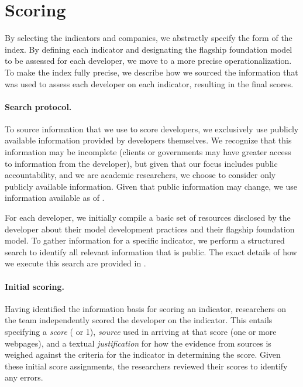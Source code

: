 \hypertarget{scoring}{\section{Scoring}}
\label{sec:scoring}
By selecting the indicators and companies, we abstractly specify the form of the index.
By defining each indicator and designating the flagship foundation model to be assessed for each developer, we move to a more precise operationalization. 
To make the index fully precise, we describe how we sourced the information that was used to assess each developer on each indicator, resulting in the final scores.

\paragraph{Search protocol.}
To source information that we use to score developers, we exclusively use publicly available information provided by developers themselves.
We recognize that this information may be incomplete (\eg clients or governments may have greater access to information from the developer), but given that our focus includes public accountability, and we are academic researchers, we choose to consider only publicly available information.
Given that public information may change, we use information available as of \informationfreezedate.

For each developer, we initially compile a basic set of resources disclosed by the developer about their model development practices and their flagship foundation model.
To gather information for a specific indicator, we perform a structured search to identify all relevant information that is public.
The exact details of how we execute this search are provided in .

\paragraph{Initial scoring.}
Having identified the information basis for scoring an indicator, \numgraders researchers on the team independently scored the developer on the indicator.
This entails specifying a \textit{score} ( or 1), \textit{source} used in arriving at that score (\eg one or more webpages), and a textual \textit{justification} for how the evidence from sources is weighed against the criteria for the indicator in determining the score. 
Given these initial score assignments, the researchers reviewed their scores to identify any errors. 

